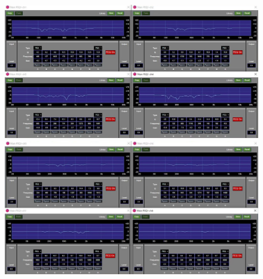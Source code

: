 \documentclass[11pt,a4j]{jreport}
\begin{document}
\begin{figure}[H]
  \begin{minipage}[b]{.5\linewidth}
    \centering
    \includegraphics[width=.9\linewidth]{images/experimentField/afcParameters/01alpha/03autoEQ1.jpg}
  \end{minipage}%
  \begin{minipage}[b]{.5\linewidth}
    \centering
    \includegraphics[width=.9\linewidth]{images/experimentField/afcParameters/01alpha/03autoEQ2.jpg}
  \end{minipage}


\end{figure}
\end{document}
